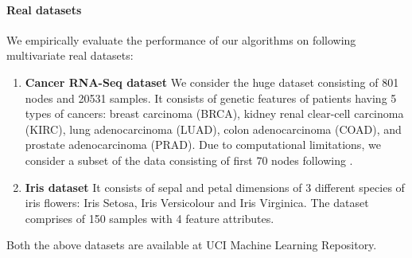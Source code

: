 \paragraph{Real datasets}
We empirically evaluate the performance of our algorithms on following multivariate real datasets:
\begin{enumerate}
	\setlength\itemsep{0.5em}
	\item \textbf{Cancer RNA-Seq dataset} We consider the huge dataset \citep{weinstein2013cancer} consisting of 801 nodes and 20531 samples. It consists of genetic features of patients having 5 types of cancers: breast carcinoma (BRCA), kidney renal clear-cell carcinoma (KIRC), lung adenocarcinoma (LUAD), colon adenocarcinoma (COAD), and prostate adenocarcinoma (PRAD). Due to computational limitations, we consider a subset of the data consisting of first 70 nodes following \cite{kumar2020unified}.
	\item \textbf{Iris dataset} It consists of sepal and petal dimensions of 3 different species of iris flowers: Iris Setosa, Iris Versicolour and Iris Virginica. The dataset \citep{fisher1936use} comprises of 150 samples with 4 feature attributes.
\end{enumerate}

Both the above datasets are available at UCI Machine Learning Repository.

